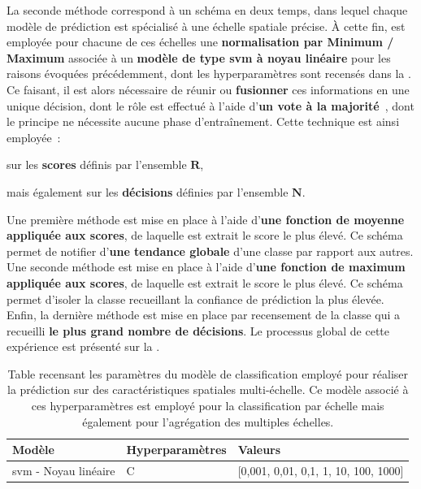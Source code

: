 La seconde méthode correspond à un schéma en deux temps, dans lequel chaque modèle de prédiction est spécialisé à une échelle spatiale précise. À cette fin, est employée pour chacune de ces échelles une \textbf{normalisation par Minimum / Maximum} associée à un \textbf{modèle de type \gls{svm} à noyau linéaire} pour les raisons évoquées précédemment, dont les hyperparamètres sont recensés dans la . Ce faisant, il est alors nécessaire de réunir ou \textbf{fusionner} ces informations en une unique décision, dont le rôle est effectué à l'aide d'\textbf{un vote à la majorité}~\cite{TinKamHo1994,Lam1997}, dont le principe ne nécessite aucune phase d'entraînement. Cette technique est ainsi employée~:
\begin{inlinerate}
    \item sur les \textbf{scores} définis par l'ensemble $\mathbf{R}$,
    \item mais également sur les \textbf{décisions} définies par l'ensemble $\mathbf{N}$.
\end{inlinerate} Une première méthode est mise en place à l'aide d'\textbf{une fonction de moyenne appliquée aux scores}, de laquelle est extrait le score le plus élevé. Ce schéma permet de notifier d'\textbf{une tendance globale} d'une classe par rapport aux autres. Une seconde méthode est mise en place à l'aide d'\textbf{une fonction de maximum appliquée aux scores}, de laquelle est extrait le score le plus élevé. Ce schéma permet d'isoler la classe recueillant la confiance de prédiction la plus élevée. Enfin, la dernière méthode est mise en place par recensement de la classe qui a recueilli \textbf{le plus grand nombre de décisions}. Le processus global de cette expérience est présenté sur la .\par

\begin{table}[H]
    \centering
    \begin{tabular}{lll}
        \toprule
        \textbf{Modèle}                                 & \textbf{Hyperparamètres}  & \textbf{Valeurs}                          \\ \midrule
        \gls{svm} - Noyau linéaire                      & C                         & [0,001, 0,01, 0,1, 1, 10, 100, 1000]      \\ 
        \bottomrule 
    \end{tabular} 
    \caption{Table recensant les paramètres du modèle de classification employé pour réaliser la prédiction sur des caractéristiques spatiales multi-échelle. Ce modèle associé à ces hyperparamètres est employé pour la classification par échelle mais également pour l'agrégation des multiples échelles.}
    \label{tab:parameters_image_improvement_models_multiscale_spatial}
\end{table}\par

